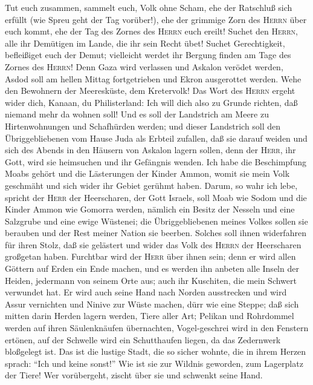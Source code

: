  Tut euch zusammen, sammelt euch, Volk ohne Scham,
 ehe der Ratschluß sich erfüllt (wie Spreu geht der Tag
vorüber!), ehe der grimmige Zorn des \textsc{Herrn} über euch kommt, ehe
der Tag des Zornes des \textsc{Herrn} euch ereilt!  Suchet
den \textsc{Herrn}, alle ihr Demütigen im Lande, die ihr sein Recht
übet! Suchet Gerechtigkeit, befleißiget euch der Demut; vielleicht
werdet ihr Bergung finden am Tage des Zornes des \textsc{Herrn}!
 Denn Gaza wird verlassen und Askalon verödet werden,
Asdod soll am hellen Mittag fortgetrieben und Ekron ausgerottet werden.
 Wehe den Bewohnern der Meeresküste, dem Kretervolk! Das
Wort des \textsc{Herrn} ergeht wider dich, Kanaan, du Philisterland: Ich
will dich also zu Grunde richten, daß niemand mehr da wohnen soll!
 Und es soll der Landstrich am Meere zu Hirtenwohnungen
und Schafhürden werden;  und dieser Landstrich soll den
Übriggebliebenen vom Hause Juda als Erbteil zufallen, daß sie darauf
weiden und sich des Abends in den Häusern von Askalon lagern sollen,
denn der \textsc{Herr}, ihr Gott, wird sie heimsuchen und ihr Gefängnis
wenden.  Ich habe die Beschimpfung Moabs gehört und die
Lästerungen der Kinder Ammon, womit sie mein Volk geschmäht und sich
wider ihr Gebiet gerühmt haben.  Darum, so wahr ich lebe,
spricht der \textsc{Herr} der Heerscharen, der Gott Israels, soll Moab
wie Sodom und die Kinder Ammon wie Gomorra werden, nämlich ein Besitz
der Nesseln und eine Salzgrube und eine ewige Wüstenei; die
Übriggebliebenen meines Volkes sollen sie berauben und der Rest meiner
Nation sie beerben.  Solches soll ihnen widerfahren für
ihren Stolz, daß sie gelästert und wider das Volk des \textsc{Herrn} der
Heerscharen großgetan haben.  Furchtbar wird der
\textsc{Herr} über ihnen sein; denn er wird allen Göttern auf Erden ein
Ende machen, und es werden ihn anbeten alle Inseln der Heiden, jedermann
von seinem Orte aus;  auch ihr Kuschiten, die mein
Schwert verwundet hat.  Er wird auch seine Hand nach
Norden ausstrecken und wird Assur vernichten und Ninive zur Wüste
machen, dürr wie eine Steppe;  daß sich mitten darin
Herden lagern werden, Tiere aller Art; Pelikan und Rohrdommel werden auf
ihren Säulenknäufen übernachten, Vogel-geschrei wird in den Fenstern
ertönen, auf der Schwelle wird ein Schutthaufen liegen, da das
Zedernwerk bloßgelegt ist.  Das ist die lustige Stadt,
die so sicher wohnte, die in ihrem Herzen sprach: ``Ich und keine
sonst!'' Wie ist sie zur Wildnis geworden, zum Lagerplatz der Tiere! Wer
vorübergeht, zischt über sie und schwenkt seine Hand.

